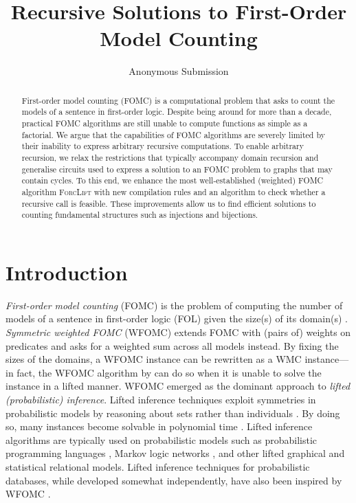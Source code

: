 \documentclass[letterpaper]{article} %
\title{Recursive Solutions to First-Order Model Counting}
\author{Anonymous Submission}
\theoremstyle{definition}
\begin{document}
\maketitle

\begin{abstract}
  First-order model counting (FOMC) is a computational problem that asks to
  count the models of a sentence in first-order logic. Despite being around for
  more than a decade, practical FOMC algorithms are still unable to compute
  functions as simple as a factorial. We argue that the capabilities of FOMC
  algorithms are severely limited by their inability to express arbitrary
  recursive computations. To enable arbitrary recursion, we relax the
  restrictions that typically accompany domain recursion and generalise circuits
  used to express a solution to an FOMC problem to graphs that may contain
  cycles. To this end, we enhance the most well-established (weighted) FOMC
  algorithm \textsc{ForcLift} with new compilation rules and an algorithm to
  check whether a recursive call is feasible. These improvements allow us to
  find efficient solutions to counting fundamental structures such as injections
  and bijections.
\end{abstract}

\section{Introduction}


\emph{First-order model counting} (FOMC) is the problem of computing the number
of models of a sentence in first-order logic (FOL) given the size(s) of its
domain(s) \citep{DBLP:conf/pods/BeameBGS15}. \emph{Symmetric weighted FOMC}
(WFOMC) extends FOMC with (pairs of) weights on predicates and asks for a
weighted sum across all models instead. By fixing the sizes of the domains, a
WFOMC instance can be rewritten as a WMC instance---in fact, the WFOMC algorithm
by \citet{DBLP:conf/ijcai/BroeckTMDR11} can do so when it is unable to solve the
instance in a lifted manner. WFOMC emerged as the dominant approach to
\emph{lifted (probabilistic) inference}. Lifted inference techniques exploit
symmetries in probabilistic models by reasoning about sets rather than
individuals \citep{DBLP:conf/ecai/Kersting12}. By doing so, many instances
become solvable in polynomial time \citep{DBLP:conf/nips/Broeck11}. Lifted
inference algorithms are typically used on probabilistic models such as
probabilistic programming languages
\citep{DBLP:journals/ml/RaedtK15,DBLP:journals/ijar/RiguzziBZCL17}, Markov logic
networks
\citep{DBLP:conf/ijcai/BroeckTMDR11,DBLP:journals/cacm/GogateD16,DBLP:journals/ml/RichardsonD06},
and other lifted graphical \citep{DBLP:journals/ml/KimmigMG15} and statistical
relational \citep{DBLP:series/synthesis/2016Raedt} models. Lifted inference
techniques for probabilistic databases, while developed somewhat independently,
have also been inspired by WFOMC
\citep{DBLP:journals/pvldb/GatterbauerS15,DBLP:journals/debu/GribkoffSB14}.
\end{document}
